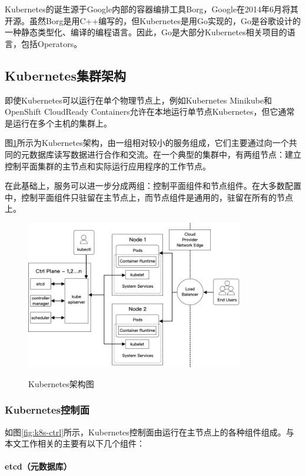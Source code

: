 \documentclass[macfonts,master]{njuthesis}
\begin{document}
Kubernetes的诞生源于Google内部的容器编排工具Borg，Google在2014年6月\cite{googleopen}将其开源\cite{k8sorigin}。虽然Borg是用C++编写的，但Kubernetes是用Go实现的，Go是谷歌设计的一种静态类型化、编译的编程语言。因此，Go是大部分Kubernetes相关项目的语言，包括Operators。


\subsection{Kubernetes集群架构}
即使Kubernetes可以运行在单个物理节点上，例如Kubernetes Minikube和OpenShift CloudReady Containers允许在本地运行单节点Kubernetes，但它通常是运行在多个主机的集群上。

图\ref{fig:k8s-arch}所示为Kubernetes架构，由一组相对较小的服务组成，它们主要通过向一个共同的元数据库读写数据进行合作和交流。在一个典型的集群中，有两组节点：建立控制平面集群的主节点和实际运行应用程序的工作节点。

在此基础上，服务可以进一步分成两组：控制平面组件和节点组件。在大多数配置中，控制平面组件只驻留在主节点上，而节点组件是通用的，驻留在所有的节点上\cite{k8scomponents}。

\begin{figure}[htbp]
  \centering
  \includegraphics[width=0.85\textwidth]{pics/Kubernetes-architecture.png}\\
  \caption{Kubernetes架构图}\label{fig:k8s-arch}
\end{figure}

\subsubsection{Kubernetes控制面}
如图\ref{fig:k8s-ctrl}所示，Kubernetes控制面由运行在主节点上的各种组件组成。与本文工作相关的主要有以下几个组件：

\paragraph{etcd（元数据库）}
\end{document}
